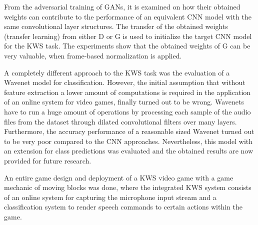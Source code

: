 From the adversarial training of GANs, it is examined on how their obtained weights can contribute to the performance of an equivalent CNN model with the same convolutional layer structures.
The transfer of the obtained weights (transfer learning) from either D or G is used to initialize the target CNN model for the KWS task.
The experiments show that the obtained weights of G can be very valuable, when frame-based normalization is applied.

A completely different approach to the KWS task was the evaluation of a Wavenet \cite{Oord2016} model for classification.
However, the initial assumption that without feature extraction a lower amount of computations is required in the application of an online system for video games, finally turned out to be wrong.
Wavenets have to run a huge amount of operations by processing each sample of the audio files from the dataset through dilated convolutional filters over many layers.
Furthermore, the accuracy performance of a reasonable sized Wavenet turned out to be very poor compared to the CNN approaches.
Nevertheless, this model with an extension for class predictions was evaluated and the obtained results are now provided for future research.

An entire game design and deployment of a KWS video game with a game mechanic of moving blocks was done, where the integrated KWS system consists of an online system for capturing the microphone input stream and a classification system to render speech commands to certain actions within the game.